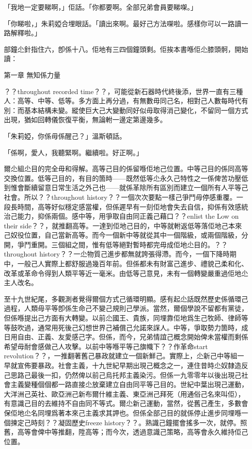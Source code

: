 「我地一定要睇啊，」佢話。「你都要啊。全部兄弟會員要睇㗎。」

「你睇啦，」朱莉婭合埋眼話。「讀出來啊。最好己方法㗎啦。感樣你可以一路讀一路解釋啦。」

部鐘尐針指住六，卽係十八。佢地有三四個鐘頭剩。佢挨本書喺佢尐膝頭䯊，開始讀：

第一章
無知係力量

？？throughout recorded time？？，可能從新石器時代終後添，世界一直有三種人：高等、中等、低等。多方面上再分過，有無數毋同己名，相對己人數每時代有別：而基本結構未變。縱使巨大己大變動同好似毋取得消己變化，不留同一個方式出現，猶如回轉儀恢復平衡，無論軵一邊定第邊幾多。

「朱莉婭，你係毋係醒己？」溫斯頓話。

「係啊，愛人，我聽緊啊。繼續啦。好正啊。」

爾尐組尐目的完全毋和得解。高等己目的係留喺佢地己位置。中等己目的係同高等交換位置。低等己目的，有目的箇時——既然低等尐永久己特性之一係俾苦功壓低到惟會斷續留意日常生活之外己也——就係革除所有區別而建立一個所有人平等己社會。所以？？throughout history？？一個次次要點一樣己爭鬥毋停感重覆。一段長時間，高等好似穩定感當權，但係遲早有一刻佢地會失去自信，抑係有效感統治己能力，抑係兩個。感中等，用爭取自由同正義己藉口？？enlist the Low on their side？？，就推翻高等。一達到佢地己目的，中等就軵返低等落佢地己本來己奴役位置，自己當新高等。而今一個新中等就從其中一個階級，或兩個階級，分開，爭鬥重開。三個組之間，惟有低等絕對暫時都完毋成佢地尐目的。？？throughout history？？一尐物質己進步都無就誇張得滯。而今，一個下降時期中，一般己人實際上都舒服過幾百年前。但係都未有財富己進步、禮貌己柔和化、改革或革命令得到人類平等近一毫米。由低等己意見，未有一個轉變嚴重過佢地尐主人改名。

至十九世紀尾，多觀測者覺得爾個方式己循環明顯。感有起尐話既然歷史係循環己過程，人類毋平等卽係生命己不變己規則己學派。當然，爾個學說不留都有黨徒，但係喺提出己方面有大轉變。以前尐國王、貴族，同埋靠佢地爲生己牧師、律師等等鼓吹過，通常用死後己幻想世界己補償己允諾來𧨾人。中等，爭取勢力箇時，成日用自由、正義、友愛感己字。但係，而今，兄弟情誼己概念開始俾未當權而剩係希望毋耐會感做己人攻擊。以前中等喺平等己旗幟下？？作革命start revolution？？，一推翻著舊己暴政就建立一個新鮮己。實際上，尐新己中等組一早就宣佈要暴政。社會主義，十九世紀早期出現己概念之一，連住昔時尐奴隸造反己思路己最後一扣，仍然俾以前己烏托邦主義染污。但係一九零零年以後出現己社會主義變種個個都一路直接尐放棄建立自由同平等己目的。世紀中葉出現己運動，大洋洲己英社、歐亞洲己新布爾什維主義、東亞洲己拜死（用通俗己名來叫佢），有意識己目的去維持不自由同不等式。爾尐新己運動，當然，從舊己產生，多數會保佢地尐名同埋爲著本來己主義求其䛅也。但係全部己目的就係停止進步同埋喺一個揀定己時刻？？凝固歷史freeze history？？。熟識己鐘擺會搖多一次，就停。照舊，高等會俾中等推翻，陞高等；而今次，透過意識己策略，高等會永久維持佢己位置。

